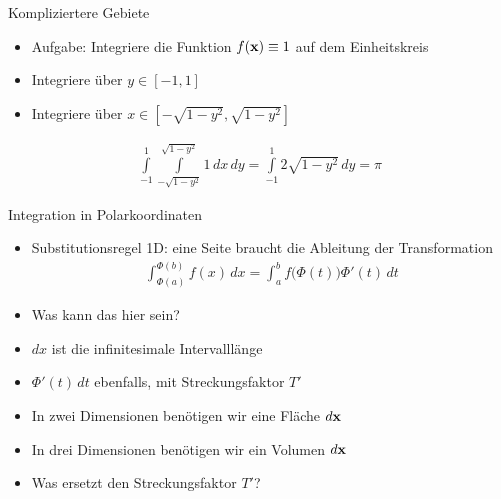 \begin{frame}{Kompliziertere Gebiete}
  \begin{itemize}
  \item Aufgabe: Integriere die Funktion $f(\mathbf{x}) \equiv 1$ auf dem Einheitskreis
  \item Integriere über $y\in[-1,1]$
  \item Integriere über $x\in[-\sqrt{1-y^2},\sqrt{1-y^2}]$
  \end{itemize}
  \pause
  \begin{gather*}
    \int\limits_{-1}^1 \int\limits_{-\sqrt{1-y^2}}^{\sqrt{1-y^2}} 1 \,dx\,dy
    = \int\limits_{-1}^1 2 \sqrt{1-y^2} \,dy
    = \pi
  \end{gather*}
\end{frame}

\begin{frame}{Integration in Polarkoordinaten}
  \pause
  \begin{itemize}
  \item Substitutionsregel 1D: eine Seite braucht die Ableitung der Transformation
    \begin{gather*}
      \int_{\Phi(a)}^{\Phi(b)} f(x)\,dx=
      \int_a^b f\bigl(\Phi(t)\bigr)\Phi'(t)\,dt
    \end{gather*}
  \item Was kann das hier sein?
  \item $dx$ ist die infinitesimale Intervalllänge
  \item $\Phi'(t)\,dt$ ebenfalls, mit Streckungsfaktor $T'$
    \pause
  \item In zwei Dimensionen benötigen wir eine Fläche $d\mathbf{x}$
  \item In drei Dimensionen benötigen wir ein Volumen $d\mathbf{x}$
  \item Was ersetzt den Streckungsfaktor $T'$?
  \end{itemize}
\end{frame}

